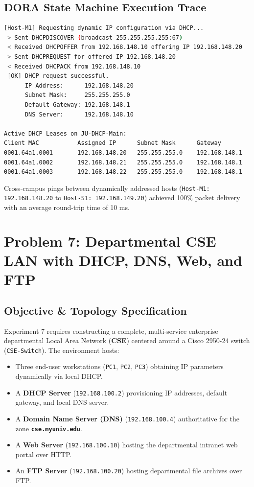 \documentclass[12pt, a4paper]{article}
\begin{document}
\subsection{DORA State Machine Execution Trace}
\begin{lstlisting}[language=bash, caption={DORA Handshake and Active Lease Table Output}]
[Host-M1] Requesting dynamic IP configuration via DHCP...
 > Sent DHCPDISCOVER (broadcast 255.255.255.255:67)
 < Received DHCPOFFER from 192.168.148.10 offering IP 192.168.148.20
 > Sent DHCPREQUEST for offered IP 192.168.148.20
 < Received DHCPACK from 192.168.148.10
 [OK] DHCP request successful.
      IP Address:      192.168.148.20
      Subnet Mask:     255.255.255.0
      Default Gateway: 192.168.148.1
      DNS Server:      192.168.148.10

Active DHCP Leases on JU-DHCP-Main:
Client MAC           Assigned IP      Subnet Mask      Gateway
0001.64a1.0001       192.168.148.20   255.255.255.0    192.168.148.1
0001.64a1.0002       192.168.148.21   255.255.255.0    192.168.148.1
0001.64a1.0003       192.168.148.22   255.255.255.0    192.168.148.1
\end{lstlisting}

Cross-campus pings between dynamically addressed hosts (\texttt{Host-M1: 192.168.148.20} to \texttt{Host-S1: 192.168.149.20}) achieved 100\% packet delivery with an average round-trip time of 10 ms.

\section{Problem 7: Departmental CSE LAN with DHCP, DNS, Web, and FTP}

\subsection{Objective \& Topology Specification}
Experiment 7 requires constructing a complete, multi-service enterprise departmental Local Area Network (\textbf{CSE}) centered around a Cisco 2950-24 switch (\texttt{CSE-Switch}). The environment hosts:
\begin{itemize}
    \item Three end-user workstations (\texttt{PC1}, \texttt{PC2}, \texttt{PC3}) obtaining IP parameters dynamically via local DHCP.
    \item A \textbf{DHCP Server} (\texttt{192.168.100.2}) provisioning IP addresses, default gateway, and local DNS server.
    \item A \textbf{Domain Name Server (DNS)} (\texttt{192.168.100.4}) authoritative for the zone \textbf{\texttt{cse.myuniv.edu}}.
    \item A \textbf{Web Server} (\texttt{192.168.100.10}) hosting the departmental intranet web portal over HTTP.
    \item An \textbf{FTP Server} (\texttt{192.168.100.20}) hosting departmental file archives over FTP.
\end{itemize}
\end{document}
